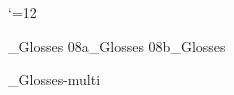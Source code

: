



 \catcode`\@=12









\gathertags


%

%
%

_Glosses
\get 08a_Glosses
\get 08b_Glosses
%
%


\bye
_Glosses-multi

